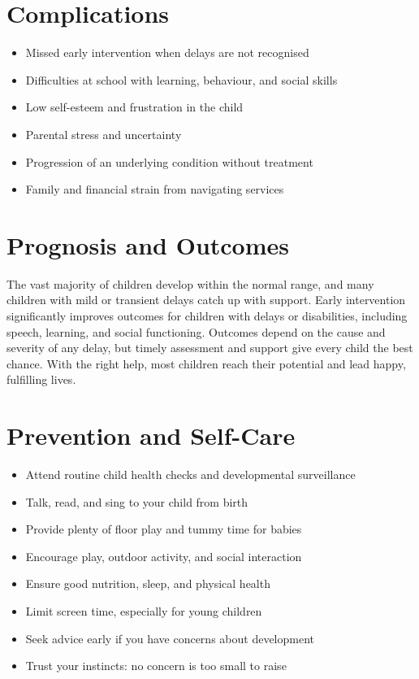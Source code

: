 \section*{Complications}
\begin{itemize}
    \item Missed early intervention when delays are not recognised
    \item Difficulties at school with learning, behaviour, and social skills
    \item Low self-esteem and frustration in the child
    \item Parental stress and uncertainty
    \item Progression of an underlying condition without treatment
    \item Family and financial strain from navigating services
\end{itemize}

\section*{Prognosis and Outcomes}
The vast majority of children develop within the normal range, and many children with mild or transient delays catch up with support. Early intervention significantly improves outcomes for children with delays or disabilities, including speech, learning, and social functioning. Outcomes depend on the cause and severity of any delay, but timely assessment and support give every child the best chance. With the right help, most children reach their potential and lead happy, fulfilling lives.

\section*{Prevention and Self-Care}
\begin{itemize}
    \item Attend routine child health checks and developmental surveillance
    \item Talk, read, and sing to your child from birth
    \item Provide plenty of floor play and tummy time for babies
    \item Encourage play, outdoor activity, and social interaction
    \item Ensure good nutrition, sleep, and physical health
    \item Limit screen time, especially for young children
    \item Seek advice early if you have concerns about development
    \item Trust your instincts: no concern is too small to raise
\end{itemize}

